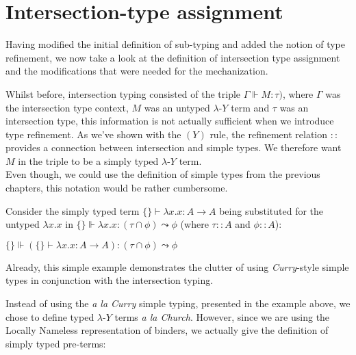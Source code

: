 \documentclass[a4paper, 12pt, twoside]{style/ociamthesis}
\theoremstyle{plain}
\theoremstyle{definition}
\newtheorem{Example}{Example}[chapter]
\theoremstyle{remark}
\newcommand{\lamy}{\lambda\text{-}Y}
\renewenvironment{Example}{\begin{OldExample}\begin{mdframed}[style=example, linecolor=yellow]}{\end{mdframed}\end{OldExample}}
\begin{document}
\section{Intersection-type
assignment}\label{intersection-type-assignment}

Having modified the initial definition of sub-typing and added the
notion of type refinement, we now take a look at the definition of
intersection type assignment and the modifications that were needed for
the mechanization.

Whilst before, intersection typing consisted of the triple
\(\Gamma \Vdash M : \tau)\), where \(\Gamma\) was the intersection type
context, \(M\) was an untyped \(\lamy\) term and \(\tau\) was an
intersection type, this information is not actually sufficient when we
introduce type refinement. As we've shown with the \((Y)\) rule, the
refinement relation \(::\) provides a connection between intersection
and simple types. We therefore want \(M\) in the triple to be a simply
typed \(\lamy\) term.\\
Even though, we could use the definition of simple types from the
previous chapters, this notation would be rather cumbersome.

\begin{Example}

Consider the simply typed term \(\{\} \vdash \lambda x.x : A \to A\)
being substituted for the untyped \(\lambda x.x\) in
\(\{\} \Vdash \lambda x.x : (\tau \cap \phi) \leadsto \phi\) (where
\(\tau :: A\) and \(\phi :: A\)):

\begin{center}
$\{\} \Vdash (\{\} \vdash \lambda x.x : A \to A) : (\tau \cap \phi) \leadsto \phi$
\end{center}

Already, this simple example demonstrates the clutter of using
\emph{Curry}-style simple types in conjunction with the intersection
typing.

\end{Example}

Instead of using the \emph{a la Curry} simple typing, presented in the
example above, we chose to define typed \(\lamy\) terms \emph{a la
Church}. However, since we are using the Locally Nameless representation
of binders, we actually give the definition of simply typed pre-terms:
\end{document}
